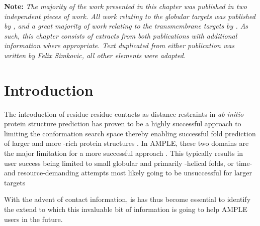 \textbf{Note: }\textit{The majority of the work presented in this chapter was published in two independent pieces of work. All work relating to the globular targets was published by \textcite{Simkovic2016-wk}, and a great majority of work relating to the transmembrane targets by \textcite{Thomas2017-sh}. As such, this chapter consists of extracts from both publications with additional information where appropriate. Text duplicated from either publication was written by Felix Simkovic, all other elements were adapted.}

\section{Introduction}
The introduction of residue-residue contacts as distance restraints in \textit{ab initio} protein structure prediction has proven to be a highly successful approach to limiting the conformation search space thereby enabling successful fold prediction of larger and more \textbeta-rich protein structures \cite[e.g.,][]{Marks2011-os,Michel2014-eg,Kosciolek2014-bt,Ovchinnikov2015-tn,Ovchinnikov2016-jj,Michel2017-xh,De_Oliveira2017-sg,Ovchinnikov2017-nd,Wang2017-rx}. In AMPLE, these two domains are the major limitation for a more successful approach \cite{Bibby2012-lm}. This typically results in user success being limited to small globular and primarily \textalpha-helical folds, or time- and resource-demanding attempts most likely going to be unsuccessful for larger targets

With the advent of contact information, is has thus become essential to identify the extend to which this invaluable bit of information is going to help AMPLE users in the future. 

